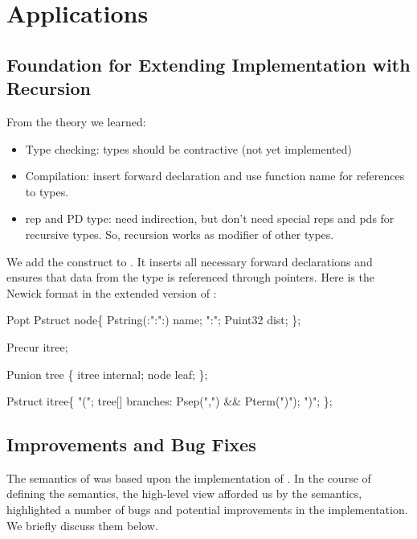 \section{Applications}
\label{sec:applications}

\subsection{Foundation for Extending Implementation with Recursion}

From the theory we learned:
\begin{itemize}
\item Type checking: types should be contractive (not yet implemented)
\item Compilation: insert forward declaration and use function name for
  references to types.
\item rep and PD type: need indirection, but don't need special reps
  and pds for recursive types. So, recursion works as modifier of
  other types.
\end{itemize}

We add the construct  to \pads{}. It inserts all
necessary forward declarations and ensures that data from the type is
referenced through pointers. Here is the Newick format in the extended
version of \pads{}:

\begin{code}
Popt Pstruct node\{
  Pstring(:":":) name; ":";
  Puint32 dist;
\};\linebreak

Precur itree;\linebreak

Punion tree \{
  itree internal;
  node leaf;
\};\linebreak

Pstruct itree\{
  "(";
  tree[] branches: Psep(",") && Pterm(")");
  ")";
\};
\end{code}

\subsection{Improvements and Bug Fixes}

The semantics of \ddc{} was based upon the implementation of \pads{}.
In the course of defining the semantics, the high-level view afforded
us by the semantics, highlighted a number of bugs and potential
improvements in the \pads{} implementation. We briefly discuss them
below.

